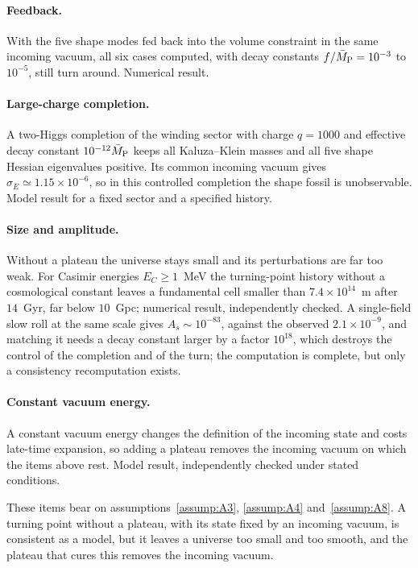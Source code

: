 \paragraph{Feedback.}
With the five shape modes fed back into the volume constraint in the same incoming vacuum, all six cases computed, with decay constants $f/\bar M_{\mathrm{P}}=10^{-3}$ to $10^{-5}$, still turn around. %
Numerical result.

\paragraph{Large-charge completion.}
A two-Higgs completion of the winding sector with charge $q=1000$ and effective decay constant $10^{-12}\bar M_{\mathrm{P}}$ keeps all Kaluza--Klein masses and all five shape Hessian eigenvalues positive. %
Its common incoming vacuum gives $\sigma_E\simeq1.15\times10^{-6}$, so in this controlled completion the shape fossil is unobservable. %
Model result for a fixed sector and a specified history.

\paragraph{Size and amplitude.}
Without a plateau the universe stays small and its perturbations are far too weak.
For Casimir energies $E_C\ge1$~MeV the turning-point history without a cosmological constant leaves a fundamental cell smaller than $7.4\times10^{14}$~m after $14$~Gyr, far below $10$~Gpc; numerical result, independently checked. %
A single-field slow roll at the same scale gives $A_s\sim10^{-83}$, against the observed $2.1\times10^{-9}$, and matching it needs a decay constant larger by a factor $10^{18}$, which destroys the control of the completion and of the turn; the computation is complete, but only a consistency recomputation exists. %

\paragraph{Constant vacuum energy.}
A constant vacuum energy changes the definition of the incoming state and costs late-time expansion, so adding a plateau removes the incoming vacuum on which the items above rest. %
Model result, independently checked under stated conditions.

These items bear on assumptions~\ref{assump:A3}, \ref{assump:A4} and~\ref{assump:A8}.
A turning point without a plateau, with its state fixed by an incoming vacuum, is consistent as a model, but it leaves a universe too small and too smooth, and the plateau that cures this removes the incoming vacuum.

